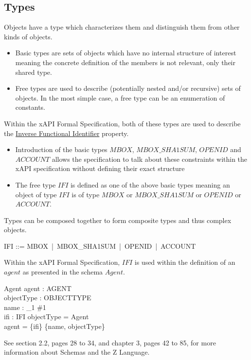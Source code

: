 \documentclass[../main.tex]{subfiles}
\begin{document}
\subsection{Types}
Objects have a type which characterizes them and distinguish them from other kinds of objects.
\begin{itemize}
\item Basic types are sets of objects which have no internal structure of interest meaning the concrete definition of the members
  is not relevant, only their shared type.
\item Free types are used to describe (potentially nested and/or recursive) sets of objects. In the most simple case, a free type
  can be an enumeration of constants.
\end{itemize}
Within the xAPI Formal Specification, both of these types are used to describe the
\href{https://github.com/adlnet/xAPI-Spec/blob/master/xAPI-Data.md#inversefunctional}{Inverse Functional Identifier}
property.
\begin{itemize}
\item Introduction of the basic types $MBOX$, $MBOX\_SHA1SUM$, $OPENID$ and $ACCOUNT$
  allows the specification to talk about these constraints within the xAPI
  specification without defining their exact structure
\item The free type $IFI$ is defined as one of the above basic types meaning an object
  of type $IFI$ is of type $MBOX$ or $MBOX\_SHA1SUM$ or $OPENID$ or $ACCOUNT$.
\end{itemize}
Types can be composed together to form composite types and thus complex objects.
\begin{zed}
  \also
  IFI ::= MBOX \,|\, MBOX\_SHA1SUM \,|\, OPENID \,|\, ACCOUNT
\end{zed}
Within the xAPI Formal Specification, $IFI$ is used within the definition
of an $agent$ as presented in the schema $Agent$.

\begin{schema}{Agent}
  agent : AGENT \\
  objectType : OBJECTTYPE \\
  name : \finset_1 \#1 \\
  ifi : IFI
  \where
  objectType = Agent \\
  agent = \{ifi\} \cup \power \{name, objectType\}
\end{schema}
See section 2.2, pages 28 to 34, and chapter 3, pages 42 to 85, for more information about Schemas and the Z Language.
\end{document}
